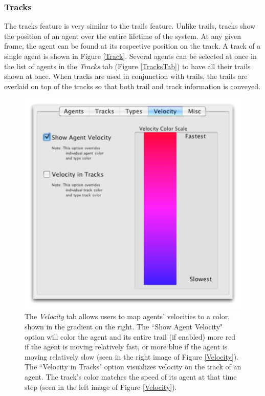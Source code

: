 \documentclass{vgtc}
\begin{document}
\subsubsection{Tracks}

The tracks feature is very similar to the trails feature. Unlike trails, tracks show the position of an agent over the entire
lifetime of the system. At any given frame, the agent can be found at its respective position on the track.
A track of a single agent is shown in Figure \ref{Track}.
Several agents can be selected at once in the list of agents in the \textit{Tracks} tab (Figure \ref{TracksTab}) to
have all their trails shown at once.
When tracks are used in conjunction with trails, the trails are overlaid on top of the tracks so that
both trail and track information is conveyed.





\begin{figure}
\centering
\includegraphics[scale=.5]{images/velocitytab.pdf}
\caption{
The \textit{Velocity} tab allows users to map agents' velocities to a color, shown in the gradient on the right.
The ``Show Agent Velocity" option will color the agent and its entire trail (if enabled) more red if the agent is moving relatively fast,
or more blue if the agent is moving relatively slow (seen in the right image of Figure \ref{Velocity}).
The ``Velocity in Tracks" option visualizes velocity on the track of an agent.
The track's color matches the speed of its agent at that time step (seen in the left image of Figure \ref{Velocity}).}
\label{VelocityTab}
\end{figure}
\end{document}
